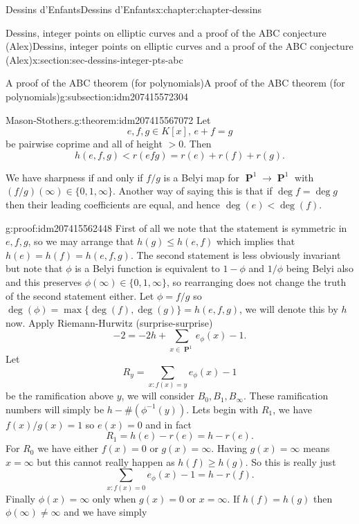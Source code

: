 \documentclass[oneside,10pt,]{book}
\numberwithin{equation}{section}
\newcommand{\inv}{^{-1}}
\DeclareMathOperator{\PP}{\mathbf{P}}
\newcommand{\lt}{<}
\newcommand{\gt}{>}
\begin{document}
\begin{chapterptx}{Dessins d'Enfants}{}{Dessins d'Enfants}{}{}{x:chapter:chapter-dessins}
\begin{sectionptx}{Dessins, integer points on elliptic curves and a proof of the ABC conjecture (Alex)}{}{Dessins, integer points on elliptic curves and a proof of the ABC conjecture (Alex)}{}{}{x:section:sec-dessins-integer-pts-abc}
\begin{subsectionptx}{A proof of the ABC theorem (for polynomials)}{}{A proof of the ABC theorem (for polynomials)}{}{}{g:subsection:idm207415572304}
\begin{theorem}{Mason-Stothers.}{}{g:theorem:idm207415567072}
Let%
\begin{equation*}
e,f,g\in K[x],\,e + f = g
\end{equation*}
be pairwise coprime and all of height \(\gt 0\). Then%
\begin{equation*}
h(e,f,g) \lt r(efg) = r(e) + r(f)  + r(g)\text{.}
\end{equation*}
%
\par
We have sharpness if and only if \(f/g\) is a Belyi map for \(\PP^1 \to \PP^1\) with \((f/g)(\infty) \in \{0,1,\infty\}\). Another way of saying this is that if \(\deg f = \deg g\) then their leading coefficients are equal, and hence \(\deg (e) \lt \deg (f)\).%
\end{theorem}
\begin{proofptx}{}{g:proof:idm207415562448}
First of all we note that the statement is symmetric in \(e,f,g\), so we may arrange that \(h(g) \le h(e,f)\) which implies that \(h(e) = h(f) = h(e,f,g)\). The second statement is less obviously invariant but note that \(\phi\) is  a Belyi function is equivalent to \(1-\phi\) and \(1/\phi\) being Belyi also and this preserves \(\phi(\infty) \in \{0,1,\infty\}\), so rearranging does not change the truth of the second statement either. Let \(\phi = f/g\) so \(\deg(\phi) = \max\{\deg (f), \deg(g)\} = h(e,f,g)\), we will denote this by \(h\) now. Apply Riemann-Hurwitz (surprise-surprise)%
\begin{equation*}
-2 = -2h + \sum_{x\in \PP^1} e_\phi(x) - 1\text{.}
\end{equation*}
Let%
\begin{equation*}
R_y = \sum_{x : f(x) = y} e_\phi(x) - 1
\end{equation*}
be the ramification above \(y\), we will consider \(B_0, B_1, B_\infty\). These ramification numbers will simply be \(h - \#(\phi\inv(y))\). Lets begin with \(R_1\), we have \(f(x)/g(x) = 1\) so \(e(x) = 0\) and in fact%
\begin{equation*}
R_1 = h(e) - r(e) = h - r(e)\text{.}
\end{equation*}
For \(R_0\) we have either \(f(x) = 0\) or \(g(x) = \infty\). Having \(g(x) = \infty\) means \(x = \infty\) but this cannot really happen as \(h(f) \ge h(g)\). So this is really just%
\begin{equation*}
\sum_{x : f(x) = 0} e_\phi(x) - 1 = h  - r(f)\text{.}
\end{equation*}
Finally \(\phi(x) = \infty\) only when \(g(x) = 0\) or \(x = \infty\). If \(h(f) = h(g)\) then \(\phi(\infty) \ne \infty\) and we have simply%
\begin{equation*}

\end{equation*}
\end{proofptx}
\end{subsectionptx}
\end{sectionptx}
\end{chapterptx}
\end{document}
